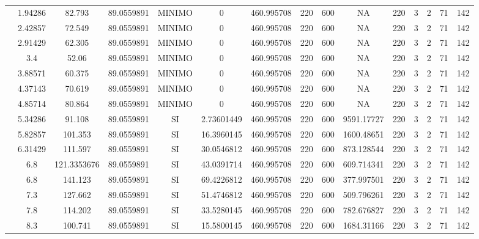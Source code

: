 \begin{table}[H]
{\begin{tabular}{|c|c|c|c|c|c|c|c|c|c|c|c|c|c|c|}
\cline{2-15}    & 1.94286 & 82.793 & 89.0559891 & MINIMO & 0   & 460.995708 & 220 & 600 & NA  & 220 & 3   & 2   & 71  & 142 \bigstrut\\
\cline{2-15}    & 2.42857 & 72.549 & 89.0559891 & MINIMO & 0   & 460.995708 & 220 & 600 & NA  & 220 & 3   & 2   & 71  & 142 \bigstrut\\
\cline{2-15}    & 2.91429 & 62.305 & 89.0559891 & MINIMO & 0   & 460.995708 & 220 & 600 & NA  & 220 & 3   & 2   & 71  & 142 \bigstrut\\
\cline{2-15}    & 3.4 & 52.06 & 89.0559891 & MINIMO & 0   & 460.995708 & 220 & 600 & NA  & 220 & 3   & 2   & 71  & 142 \bigstrut\\
\cline{2-15}    & 3.88571 & 60.375 & 89.0559891 & MINIMO & 0   & 460.995708 & 220 & 600 & NA  & 220 & 3   & 2   & 71  & 142 \bigstrut\\
\cline{2-15}    & 4.37143 & 70.619 & 89.0559891 & MINIMO & 0   & 460.995708 & 220 & 600 & NA  & 220 & 3   & 2   & 71  & 142 \bigstrut\\
\cline{2-15}    & 4.85714 & 80.864 & 89.0559891 & MINIMO & 0   & 460.995708 & 220 & 600 & NA  & 220 & 3   & 2   & 71  & 142 \bigstrut\\
\cline{2-15}    & 5.34286 & 91.108 & 89.0559891 & SI  & 2.73601449 & 460.995708 & 220 & 600 & 9591.17727 & 220 & 3   & 2   & 71  & 142 \bigstrut\\
\cline{2-15}    & 5.82857 & 101.353 & 89.0559891 & SI  & 16.3960145 & 460.995708 & 220 & 600 & 1600.48651 & 220 & 3   & 2   & 71  & 142 \bigstrut\\
\cline{2-15}    & 6.31429 & 111.597 & 89.0559891 & SI  & 30.0546812 & 460.995708 & 220 & 600 & 873.128544 & 220 & 3   & 2   & 71  & 142 \bigstrut\\
\cline{2-15}    & 6.8 & 121.3353676 & 89.0559891 & SI  & 43.0391714 & 460.995708 & 220 & 600 & 609.714341 & 220 & 3   & 2   & 71  & 142 \bigstrut\\
\cline{2-15}    & 6.8 & 141.123 & 89.0559891 & SI  & 69.4226812 & 460.995708 & 220 & 600 & 377.997501 & 220 & 3   & 2   & 71  & 142 \bigstrut\\
\cline{2-15}    & 7.3 & 127.662 & 89.0559891 & SI  & 51.4746812 & 460.995708 & 220 & 600 & 509.796261 & 220 & 3   & 2   & 71  & 142 \bigstrut\\
\cline{2-15}    & 7.8 & 114.202 & 89.0559891 & SI  & 33.5280145 & 460.995708 & 220 & 600 & 782.676827 & 220 & 3   & 2   & 71  & 142 \bigstrut\\
\cline{2-15}    & 8.3 & 100.741 & 89.0559891 & SI  & 15.5800145 & 460.995708 & 220 & 600 & 1684.31166 & 220 & 3   & 2   & 71  & 142 \bigstrut\\

\end{tabular}}
\end{table}
